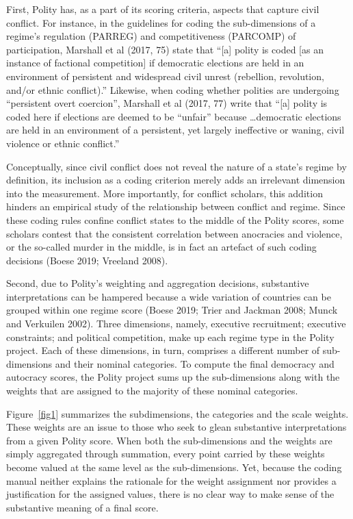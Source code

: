 \documentclass [11pt]{article}
\begin{document}
First, Polity has, as a part of its scoring criteria, aspects that capture civil conflict. For instance, in the guidelines for coding the sub-dimensions of a regime's regulation (PARREG) and competitiveness (PARCOMP) of participation, Marshall et al (2017, 75) state that ``[a] polity is coded [as an instance of factional competition] if democratic elections are held in an environment of persistent and widespread civil unrest (rebellion, revolution, and/or ethnic conflict).'' Likewise, when coding whether polities are undergoing ``persistent overt coercion'', Marshall et al (2017, 77) write that ``[a] polity is coded here if elections are deemed to be “unfair” because \dots democratic elections are held in an environment of a persistent, yet largely ineffective or waning, civil violence or ethnic conflict.''

Conceptually, since civil conflict does not reveal the nature of a state's regime by definition, its inclusion as a coding criterion merely adds an irrelevant dimension into the measurement. More importantly, for conflict scholars, this addition hinders an empirical study of the relationship between conflict and regime. Since these coding rules confine conflict states to the middle of the Polity scores, some scholars contest that the consistent correlation between anocracies and violence, or the so-called murder in the middle, is in fact an artefact of such coding decisions (Boese 2019; Vreeland 2008). 

Second, due to Polity's weighting and aggregation decisions, substantive interpretations can be hampered because a wide variation of countries can be grouped within one regime score (Boese 2019; Trier and Jackman 2008; Munck and Verkuilen 2002). Three dimensions, namely, executive recruitment; executive constraints; and political competition, make up each regime type in the Polity project. Each of these dimensions, in turn, comprises a different number of sub-dimensions and their nominal categories. To compute the final democracy and autocracy scores, the Polity project sums up the sub-dimensions along with the weights that are assigned to the majority of these nominal categories.

Figure~\ref{fig1} summarizes the subdimensions, the categories and the scale weights. These weights are an issue to those who seek to glean substantive interpretations from a given Polity score. When both the sub-dimensions and the weights are simply aggregated through summation, every point carried by these weights become valued at the same level as the sub-dimensions. Yet, because the coding manual neither explains the rationale for the weight assignment nor provides a justification for the assigned values, there is no clear way to make sense of the substantive meaning of a final score. 
\end{document}
